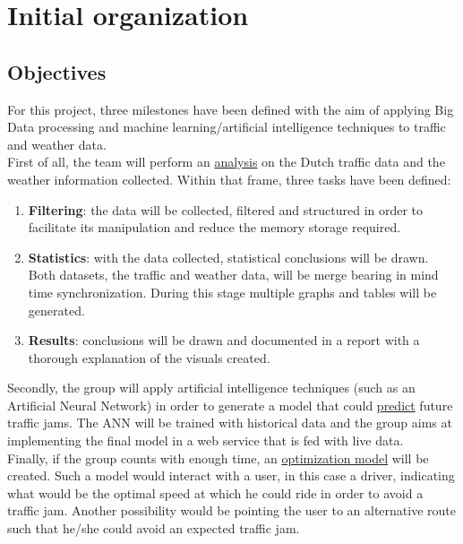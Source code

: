 \chapter{Initial organization}
\label{task1}

\section{Objectives}

For this project, three milestones have been defined with the aim of applying Big Data processing and machine learning/artificial intelligence techniques to traffic and weather data.\\

First of all, the team will perform an \underline{analysis} on the Dutch traffic data and the weather information collected. Within that frame, three tasks have been defined:

\begin{enumerate}
	\item \textbf{Filtering}: the data will be collected, filtered and structured in order to facilitate its manipulation and reduce the memory storage required.
	\item \textbf{Statistics}: with the data collected, statistical conclusions will be drawn. Both datasets, the traffic and weather data, will be merge bearing in mind time synchronization. During this stage multiple graphs and tables will be generated.
	\item \textbf{Results}: conclusions will be drawn and documented in a report with a thorough explanation of the visuals created.
\end{enumerate}

Secondly, the group will apply artificial intelligence techniques (such as an Artificial Neural Network) in order to generate a model that could \underline{predict} future traffic jams. The ANN will be trained with historical data and the group aims at implementing the final model in a web service that is fed with live data.\\

Finally, if the group counts with enough time, an \underline{optimization model} will be created. Such a model would interact with a user, in this case a driver, indicating what would be the optimal speed at which he could ride in order to avoid a traffic jam. Another possibility would be pointing the user to an alternative route such that he/she could avoid an expected traffic jam.


